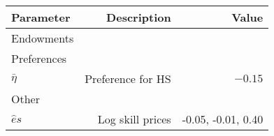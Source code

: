 \begin{tabular}{lrr}
\hline
Parameter & Description  & Value  \\
\hline
Endowments &   &   \\
Preferences &   &   \\
$\bar{\eta}$ & Preference for HS  & $-0.15$  \\
Other &   &   \\
$\hat{e}{s}$ & Log skill prices  & -0.05, -0.01, 0.40  \\
\hline
\end{tabular}%
